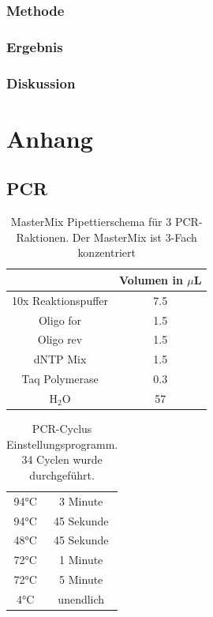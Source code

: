 \documentclass[oneside,10pt,a4paper]{report}
\begin{document}
			\subsection{Methode}
			\subsection{Ergebnis}
			\subsection{Diskussion}
			
	
	
	\chapter{Anhang}
		\section{PCR}
		\begin{table}[H]
			\centering
			\caption{MasterMix Pipettierschema für 3 PCR-Raktionen. Der MasterMix ist 3-Fach konzentriert}
			\label{tab: Mastermix-Pipettierschema}
			\begin{tabular}{cc}
				\toprule
				& Volumen in $\mu$L\\
				\midrule
				10x Reaktionspuffer & 7.5 \\
				Oligo for & 1.5\\
				Oligo rev & 1.5\\
				dNTP Mix & 1.5\\
				Taq Polymerase & 0.3\\
				H$_2$O & 57\\
				\bottomrule
			\end{tabular}
		\end{table}
		
		
		\begin{table}[H]
			\centering
			\caption{PCR-Cyclus Einstellungsprogramm. 34 Cyclen wurde durchgeführt.}
			\label{tab: PCR-Cyclen}
			\begin{tabular}{cc}
				\toprule
				94°C & 3 Minute\\
				94°C & 45 Sekunde\\
				48°C & 45 Sekunde\\
				72°C & 1 Minute\\
				72°C & 5 Minute\\
				4°C & unendlich\\
				\bottomrule
			\end{tabular}
		\end{table}
		
\end{document}
